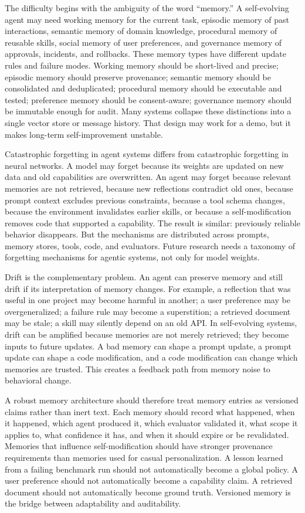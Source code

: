 The difficulty begins with the ambiguity of the word ``memory.'' A self-evolving agent may need working memory for the current task, episodic memory of past interactions, semantic memory of domain knowledge, procedural memory of reusable skills, social memory of user preferences, and governance memory of approvals, incidents, and rollbacks. These memory types have different update rules and failure modes. Working memory should be short-lived and precise; episodic memory should preserve provenance; semantic memory should be consolidated and deduplicated; procedural memory should be executable and tested; preference memory should be consent-aware; governance memory should be immutable enough for audit. Many systems collapse these distinctions into a single vector store or message history. That design may work for a demo, but it makes long-term self-improvement unstable.

Catastrophic forgetting in agent systems differs from catastrophic forgetting in neural networks. A model may forget because its weights are updated on new data and old capabilities are overwritten. An agent may forget because relevant memories are not retrieved, because new reflections contradict old ones, because prompt context excludes previous constraints, because a tool schema changes, because the environment invalidates earlier skills, or because a self-modification removes code that supported a capability. The result is similar: previously reliable behavior disappears. But the mechanisms are distributed across prompts, memory stores, tools, code, and evaluators. Future research needs a taxonomy of forgetting mechanisms for agentic systems, not only for model weights.

Drift is the complementary problem. An agent can preserve memory and still drift if its interpretation of memory changes. For example, a reflection that was useful in one project may become harmful in another; a user preference may be overgeneralized; a failure rule may become a superstition; a retrieved document may be stale; a skill may silently depend on an old API. In self-evolving systems, drift can be amplified because memories are not merely retrieved; they become inputs to future updates. A bad memory can shape a prompt update, a prompt update can shape a code modification, and a code modification can change which memories are trusted. This creates a feedback path from memory noise to behavioral change.

A robust memory architecture should therefore treat memory entries as versioned claims rather than inert text. Each memory should record what happened, when it happened, which agent produced it, which evaluator validated it, what scope it applies to, what confidence it has, and when it should expire or be revalidated. Memories that influence self-modification should have stronger provenance requirements than memories used for casual personalization. A lesson learned from a failing benchmark run should not automatically become a global policy. A user preference should not automatically become a capability claim. A retrieved document should not automatically become ground truth. Versioned memory is the bridge between adaptability and auditability.


